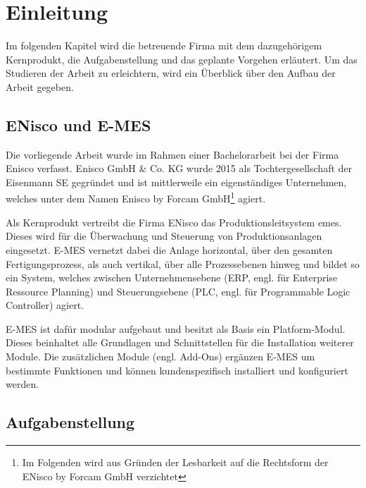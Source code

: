 \chapter{Einleitung\label{chap1:Erstes-Kapitel}}

Im folgenden Kapitel wird die betreuende Firma mit dem dazugehörigem Kernprodukt, die Aufgabenstellung und das geplante Vorgehen erläutert. Um das Studieren der Arbeit zu erleichtern, wird ein Überblick über den Aufbau der Arbeit gegeben.

\section{ENisco und E-MES\label{sec1.1:unterpunkt-1}}

Die vorliegende Arbeit wurde im Rahmen einer Bachelorarbeit bei der Firma Enisco verfasst. Enisco GmbH \& Co. KG wurde 2015 als Tochtergesellschaft der Eisenmann SE gegründet und ist mittlerweile ein eigenständiges Unternehmen, welches unter dem Namen \glqq Enisco by Forcam GmbH\footnote{Im Folgenden wird aus Gründen der Lesbarkeit auf die Rechtsform der ENisco by Forcam GmbH verzichtet}\grqq{} agiert.

Als Kernprodukt vertreibt die Firma ENisco das Produktionsleitsystem \glqq \gls{emes}\grqq{}. Dieses wird für die Überwachung und Steuerung von Produktionsanlagen eingesetzt. E-MES vernetzt dabei die Anlage horizontal, über den gesamten Fertigungsprozess, als auch vertikal, über alle Prozessebenen hinweg und bildet so ein System, welches zwischen Unternehmensebene (ERP, engl. für Enterprise Ressource Planning) und Steuerungsebene (PLC, engl. für Programmable Logic
Controller) agiert. \cite{EniscobyForcamGmbH.2021}

E-MES ist dafür modular aufgebaut und besitzt als Basis ein Platform-Modul. Dieses beinhaltet alle Grundlagen und Schnittstellen für die Installation weiterer Module. Die zusätzlichen Module (engl. Add-Ons) ergänzen E-MES um bestimmte Funktionen und können kundenspezifisch installiert und konfiguriert werden.

\section{Aufgabenstellung\label{sec1.2:Unterpunkt-2}}

